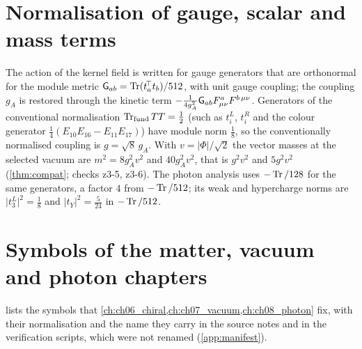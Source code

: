 \section{Normalisation of gauge, scalar and mass terms}
\label{app:units:norm}

The action of the kernel field is written for gauge generators that are orthonormal for the module metric
$\mathsf G_{ab}=\operatorname{Tr}(t_a^{\!\top}t_b)/512$, with unit gauge coupling; the coupling $g_A$ is restored through the kinetic term
$-\frac1{4g_A^2}\mathsf G_{ab}F^a_{\mu\nu}F^{b\,\mu\nu}$. Generators of the conventional normalisation $\operatorname{Tr}_{\rm fund}TT=\tfrac12$ (such as
$t^L_i$, $t^R_i$ and the colour generator $\tfrac14(E_{10}E_{16}-E_{11}E_{17})$) have module norm $\tfrac18$, so the conventionally normalised
coupling is $g=\sqrt8\,g_A$. With $v=\lvert\Phi\rvert/\sqrt2$ the vector masses at the selected vacuum are $m^2=8g_A^2v^2$ and
$40g_A^2v^2$, that is $g^2v^2$ and $5g^2v^2$ (\cref{thm:compat}; checks z3-5, z3-6). The photon analysis uses $-\operatorname{Tr}/128$ for the same
generators, a factor $4$ from $-\operatorname{Tr}/512$; its weak and hypercharge norms are $\lvert t^L_3\rvert^2=\tfrac18$ and $\lvert t_Y\rvert^2=\tfrac5{24}$ in $-\operatorname{Tr}/512$.

\section{Symbols of the matter, vacuum and photon chapters}
\label{app:units:symbols}

 lists the symbols that \cref{ch:ch06_chiral,ch:ch07_vacuum,ch:ch08_photon} fix, with their normalisation and the
name they carry in the source notes and in the verification scripts, which were not renamed (\cref{app:manifest}).

